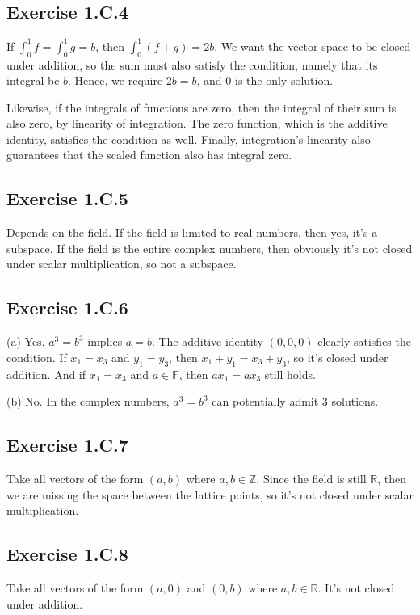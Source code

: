 \documentclass{book}
\begin{document}
\subsection*{Exercise 1.C.4}
If $\int_0^1 f = \int_0^1 g = b$, then $\int_0^1 (f + g) = 2b$. We want the vector space to be closed under addition, so the sum must also satisfy the condition, namely that its integral be $b$. Hence, we require $2b = b$, and $0$ is the only solution.

Likewise, if the integrals of functions are zero, then the integral of their sum is also zero, by linearity of integration. The zero function, which is the additive identity, satisfies the condition as well. Finally, integration's linearity also guarantees that the scaled function also has integral zero.

\subsection*{Exercise 1.C.5}
Depends on the field. If the field is limited to real numbers, then yes, it's a subspace. If the field is the entire complex numbers, then obviously it's not closed under scalar multiplication, so not a subspace.

\subsection*{Exercise 1.C.6}
(a) Yes. $a^3 = b^3$ implies $a = b$. The additive identity $(0, 0, 0)$ clearly satisfies the condition. If $x_1 = x_3$ and $y_1 = y_3$, then $x_1 + y_1 = x_3 + y_3$, so it's closed under addition. And if $x_1 = x_3$ and $a \in \mathbb{F}$, then $ax_1 = ax_3$ still holds.

(b) No. In the complex numbers, $a^3 = b^3$ can potentially admit 3 solutions.

\subsection*{Exercise 1.C.7}
Take all vectors of the form $(a, b)$ where $a, b \in \mathbb{Z}$. Since the field is still $\mathbb{R}$, then we are missing the space between the lattice points, so it's not closed under scalar multiplication.

\subsection*{Exercise 1.C.8}
Take all vectors of the form $(a, 0)$ and $(0, b)$ where $a, b \in \mathbb{R}$. It's not closed under addition.
\end{document}

